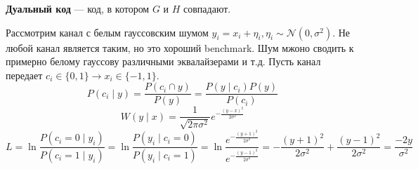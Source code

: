 \begin{definition}
    \textbf{Дуальный код} --- код, в котором \(G\) и \(H\) совпадают.
\end{definition}

Рассмотрим канал с белым гауссовским шумом \(y_i = x_i + \eta_i, \eta_i \sim \mathcal{N}(0, \sigma^2)\). 
Не любой канал является таким, но это хороший benchmark. 
Шум мжоно сводить к примерно белому гауссову различными эквалайзерами и т.д.
Пусть канал передает \(c_i \in \{0, 1\} \to x_i \in \{-1, 1\}\).
\[P(c_i \mid y) = \frac{P(c_i \cap y)}{P(y)} = \frac{P(y \mid c_i) P(y)}{P(c_i)}\] 
\[W(y \mid x) = \frac{1}{\sqrt{2 \pi \sigma^2}} e^{-\frac{(y-x)^2}{2\sigma^2}}\] 
\[L
= \ln \frac{P(c_i = 0 \mid y_i)}{P(c_i = 1 \mid y_i)}
= \ln \frac{P(y_i \mid c_i = 0)}{P(y_i \mid c_i = 1)}
= \ln \frac{e^{-\frac{(y+1)^2}{2\sigma^2}}}{e^{-\frac{(y-1)^2}{2\sigma^2}}}
= -\frac{(y+1)^2}{2\sigma^2} + \frac{(y-1)^2}{2\sigma^2}
= \frac{-2y}{\sigma^2}
\] 


